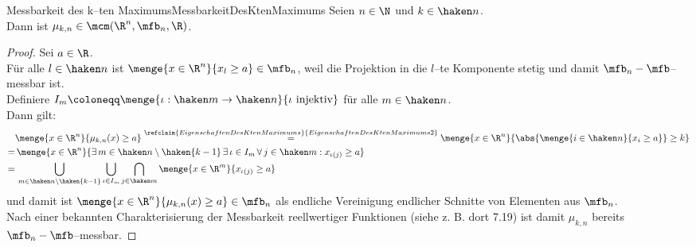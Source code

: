 \begin{lemma}{Messbarkeit des k--ten Maximums}{MessbarkeitDesKtenMaximums}
Seien $n \in \N$ und $k \in \haken n$.\\
Dann ist $\mu_{k, n} \in \mcm(\R^n, \mfb_n, \R)$.
\end{lemma}
\begin{proof}
Sei $a \in \R$.\\
Für alle $l \in \haken n$ ist $\menge{x\in \R^n}{x_l \ge a} \in \mfb_n$, weil
die Projektion in die $l$--te Komponente stetig und damit
$\mfb_n-\mfb$--messbar ist.\\
Definiere
$I_m\coloneqq \menge{\iota:\haken m\rightarrow \haken n}{\iota\text{ injektiv}}$
für alle $m \in \haken n$.\\
Dann gilt:
\begin{align*}
& \menge{x \in \R^n}{\mu_{k,n}(x)\ge a} \overset{
\refclaim{EigenschaftenDesKtenMaximums}{EigenschaftenDesKtenMaximums2}}=
\menge{x \in \R^n}{\abs{\menge{i \in \haken n}{x_i \ge a}}\ge k}\\
=&\, \menge{x \in \R^n}{\exists\, m \in \haken n \setminus \haken{k-1}\,
\exists\, \iota \in I_m\, \forall\, j \in \haken m: x_{\iota(j)}\ge a}\\
=&\, \bigcup_{m \in \haken n \setminus\haken{k-1}}\bigcup_{\iota \in I_m}
\bigcap_{j \in \haken m} \menge{x\in \R^m}{x_{\iota(j)}\ge a}
\end{align*}
und damit ist $\menge{x \in \R^n}{\mu_{k,n}(x)\ge a} \in \mfb_n$ als endliche
Vereinigung endlicher Schnitte von Elementen aus $\mfb_n$.\\
Nach einer bekannten Charakterisierung der Messbarkeit
reellwertiger Funktionen (siehe z. B. \cite{Irle} dort 7.19)
ist damit $\mu_{k, n}$ bereits $\mfb_n-\mfb$--messbar.
\end{proof}